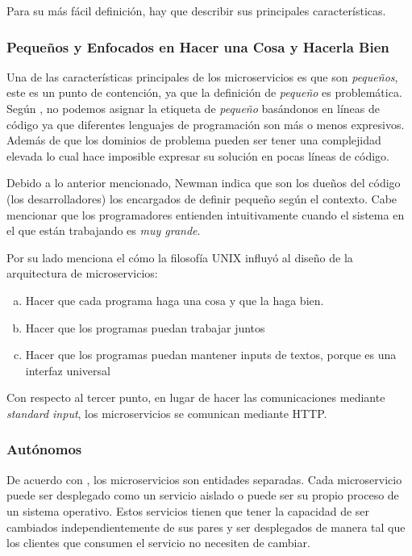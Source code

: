 Para su más fácil definición, hay que describir sus principales características.


\subsubsection{Pequeños y Enfocados en Hacer una Cosa y Hacerla Bien}

Una de las características principales de los microservicios es que son {\it pequeños}, este es un
punto de contención, ya que la definición de {\it pequeño} es problemática.
Según \cite{newman2021building}, no podemos asignar la etiqueta de {\it pequeño} basándonos en líneas
de código ya que diferentes lenguajes de programación son más o menos expresivos.
Además de que los dominios de problema pueden ser tener una complejidad elevada lo cual hace imposible
expresar su solución en pocas líneas de código.

Debido a lo anterior mencionado, Newman indica que son los dueños del código (los desarrolladores)
los encargados de definir {pequeño} según el contexto.
Cabe mencionar que los programadores entienden intuitivamente cuando el sistema en el que están trabajando
es {\it muy grande}.

Por su lado \cite{kleppmann2015kafka} menciona el cómo la filosofía UNIX influyó al diseño de la arquitectura
de microservicios:
\vspace{-1em}
\begin{enumerate}[a.]
  \item Hacer que cada programa haga una cosa y que la haga bien.
  \item Hacer que los programas puedan trabajar juntos
  \item Hacer que los programas puedan mantener inputs de textos, porque es una interfaz universal
\end{enumerate}
\vspace{-1em}

Con respecto al tercer punto, en lugar de hacer las comunicaciones mediante {\it standard input},
los microservicios se comunican mediante HTTP.


\subsubsection{Autónomos}

De acuerdo con \cite{newman2019monolith}, los microservicios son entidades separadas.
Cada microservicio puede ser desplegado como un servicio aislado o puede ser su propio proceso
de un sistema operativo.
Estos servicios tienen que tener la capacidad de ser cambiados independientemente de sus pares
y ser desplegados de manera tal que los clientes que consumen el servicio no necesiten de cambiar.


